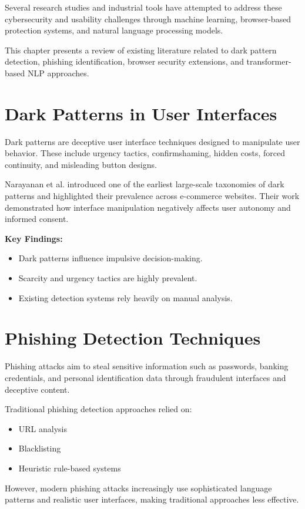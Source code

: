 \documentclass[12pt,a4paper]{report}
\begin{document}
Several research studies and industrial tools have attempted to address these cybersecurity and usability challenges through machine learning, browser-based protection systems, and natural language processing models.

This chapter presents a review of existing literature related to dark pattern detection, phishing identification, browser security extensions, and transformer-based NLP approaches.

\section{Dark Patterns in User Interfaces}
Dark patterns are deceptive user interface techniques designed to manipulate user behavior. These include urgency tactics, confirmshaming, hidden costs, forced continuity, and misleading button designs.

Narayanan et al. introduced one of the earliest large-scale taxonomies of dark patterns and highlighted their prevalence across e-commerce websites. Their work demonstrated how interface manipulation negatively affects user autonomy and informed consent.

\vspace{0.5cm}
\textbf{Key Findings:}
\begin{itemize}
\item Dark patterns influence impulsive decision-making.
\item Scarcity and urgency tactics are highly prevalent.
\item Existing detection systems rely heavily on manual analysis.
\end{itemize}

\section{Phishing Detection Techniques}
Phishing attacks aim to steal sensitive information such as passwords, banking credentials, and personal identification data through fraudulent interfaces and deceptive content.

Traditional phishing detection approaches relied on:
\begin{itemize}
\item URL analysis
\item Blacklisting
\item Heuristic rule-based systems
\end{itemize}
However, modern phishing attacks increasingly use sophisticated language patterns and realistic user interfaces, making traditional approaches less effective.
\end{document}
